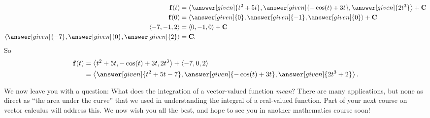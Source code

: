 \documentclass{ximera}
\begin{document}
\begin{example}
\begin{explanation}
\begin{align*}
      \vec f(t) &= \vector{\answer[given]{t^2+5t}, \answer[given]{-\cos(t) + 3t}, \answer[given]{2t^3}} + \vec C\\
      \vec f(0) &= \vector{\answer[given]{0},\answer[given]{-1},\answer[given]{0}} + \vec C\\
      \vector{-7,-1,2} &= \vector{0,-1,0} + \vec C\\
      \vector{\answer[given]{-7},\answer[given]{0},\answer[given]{2}} &= \vec C.
    \end{align*}
    So
    \begin{align*}
      \vec f(t) &= \vector{t^2+5t, -\cos(t) + 3t, 2t^3} + \vector{-7,0,2}\\
      &= \vector{\answer[given]{t^2+5t-7},\answer[given]{-\cos(t)+3t},\answer[given]{2t^3+2}}.
    \end{align*}
  \end{explanation}
\end{example}

We now leave you with a question: What does the integration of a
vector-valued function \textit{mean}?  There are many applications,
but none as direct as ``the area under the curve'' that we used in
understanding the integral of a real-valued function. Part of your
next course on vector calculus will address this. We now wish you all
the best, and hope to see you in another mathematics course soon!
\end{document}
